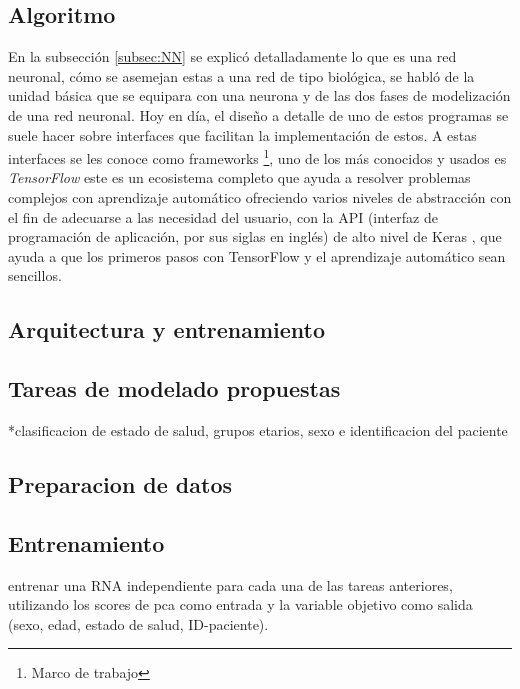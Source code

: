 \documentclass[12pt,letterpaper,oneside,openright]{book}
\begin{document}
\subsection{Algoritmo}

En la subsección \ref{subsec:NN} se explicó detalladamente lo que es una red neuronal, cómo se asemejan estas a una red de tipo biológica, se habló de la unidad básica que se equipara con una neurona y de las dos fases de modelización de una red neuronal. Hoy en día, el diseño a detalle de uno de estos programas se suele hacer sobre interfaces que facilitan la implementación de estos. A estas interfaces se les conoce como frameworks \footnote{Marco de trabajo}, uno de los más conocidos y usados es \emph{TensorFlow} \cite{tensorflow15} este es un ecosistema completo que ayuda a resolver problemas complejos con aprendizaje automático ofreciendo varios niveles de abstracción con el fin de adecuarse a las necesidad del usuario, con la API (interfaz de programación de aplicación, por sus siglas en inglés) de alto nivel de Keras \cite{keras15}, que ayuda a que los primeros pasos con TensorFlow y el aprendizaje automático sean sencillos. 

\subsection{Arquitectura y entrenamiento}
\subsection{Tareas de modelado propuestas}
*clasificacion de estado de salud, grupos etarios, sexo e identificacion del paciente
\subsection{Preparacion de datos}
\subsection{Entrenamiento} entrenar una RNA independiente para cada una de las tareas anteriores, utilizando los scores de pca como entrada y la variable objetivo como salida (sexo, edad, estado de salud, ID-paciente).
\end{document}
